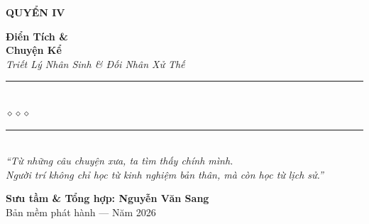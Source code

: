 \begin{titlepage}
\begin{center}
  \begin{tcolorbox}[
    width=6.5cm,
    colback=truyengold!20,
    colframe=truyengold!80!black,
    arc=4pt,
    boxrule=1.5pt,
    halign=center
  ]
    {\fontsize{18}{22}\selectfont\bfseries\color{truyenred!80!black}
     QUYỂN IV}
  \end{tcolorbox}
  \vspace{0.8cm}

  {\fontsize{38}{45}\selectfont\bfseries\color{truyenred!80!black}
    Điển Tích \&}\\[0.4cm]
  {\fontsize{38}{45}\selectfont\bfseries\color{truyengold!80!black}
    Chuyện Kể}\\[0.4cm]

  {\fontsize{16}{20}\selectfont\color{truyengold!90!black}\itshape
    Triết Lý Nhân Sinh \& Đối Nhân Xử Thế}\\[1cm]

  {\color{truyenblue!60}\rule{6cm}{1pt}}\\[5pt]
  {\color{truyengold!80!black}\large$\diamond$\hspace{1cm}$\diamond$\hspace{1cm}$\diamond$}\\[5pt]
  {\color{truyenblue!60}\rule{6cm}{1pt}}\\[1.5cm]

  {\normalsize\itshape\color{truyenblue!90!black}
   ``Từ những câu chuyện xưa, ta tìm thấy chính mình.\\
   Người trí không chỉ học từ kinh nghiệm bản thân, mà còn học từ lịch sử.''}

  \vfill

  {\fontsize{16}{20}\selectfont\bfseries\color{truyenblue!90!black}
    Sưu tầm \& Tổng hợp: \textbf{Nguyễn Văn Sang}}\\[0.4cm]

  {\small\color{gray} Bản mềm phát hành --- Năm 2026}\\[0.5cm]
\end{center}

\afterpage{\nopagecolor}
\end{titlepage}